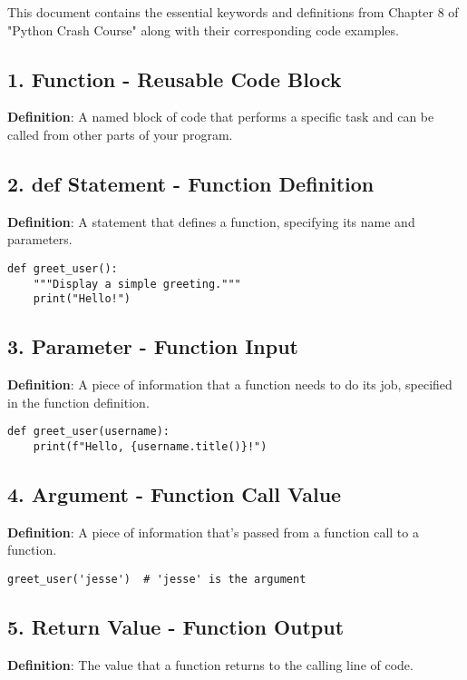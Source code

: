
This document contains the essential keywords and definitions from Chapter 8 of "Python Crash Course" along with their corresponding code examples.

\subsection*{1. Function - Reusable Code Block}
\textbf{Definition}: A named block of code that performs a specific task and can be called from other parts of your program.



\subsection*{2. def Statement - Function Definition}
\textbf{Definition}: A statement that defines a function, specifying its name and parameters.

\begin{lstlisting}
def greet_user():
    """Display a simple greeting."""
    print("Hello!")
\end{lstlisting}

\subsection*{3. Parameter - Function Input}
\textbf{Definition}: A piece of information that a function needs to do its job, specified in the function definition.

\begin{lstlisting}
def greet_user(username):
    print(f"Hello, {username.title()}!")
\end{lstlisting}

\subsection*{4. Argument - Function Call Value}
\textbf{Definition}: A piece of information that's passed from a function call to a function.

\begin{lstlisting}
greet_user('jesse')  # 'jesse' is the argument
\end{lstlisting}

\subsection*{5. Return Value - Function Output}
\textbf{Definition}: The value that a function returns to the calling line of code.

